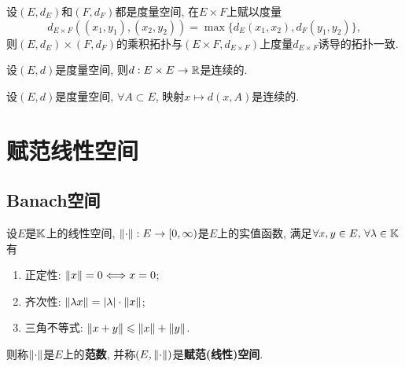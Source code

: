\begin{Remark}
	设$ (E,d_E) $和$ (F,d_F) $都是度量空间, 在$ E\times F $上赋以度量
	\[
		d_{E\times F}\left((x_1,y_1),(x_2,y_2)\right)=\max\{ d_E(x_1,x_2), d_F(y_1,y_2) \},
	\]
	则$ (E,d_E) \times (F,d_F) $的乘积拓扑与$ (E\times F, d_{E\times F}) $上度量$ d_{E\times F} $诱导的拓扑一致.
\end{Remark}

\begin{Proposition}
	设$ (E,d) $是度量空间, 则$ d : E\times E\to\mathbb{R} $是连续的.
\end{Proposition}
\begin{Corollary}\label{cor:距离函数连续}
	设$ (E,d) $是度量空间, $ \forall A\subset E $, 映射$ x\mapsto d(x,A) $是连续的.
\end{Corollary}

\section{赋范线性空间}

\subsection{Banach空间}

\begin{Definition}[赋范空间]\label{def:赋范空间}
	设$ E $是$ \mathbb{K} $上的线性空间, $ \left\| \cdot \right\| : E\to[0,\infty) $是$ E $上的实值函数, 满足$ \forall x,y\in E,\,\forall\lambda\in\mathbb{K} $有

	\begin{enumerate}[(1)]
		\item 正定性: $ \left\| x \right\|=0\Longleftrightarrow x=0 $;

		\item 齐次性: $ \left\| \lambda x \right\|=\left| \lambda \right| \cdot\left\| x \right\| $;

		\item 三角不等式: $ \left\| x+y \right\|\leqslant\left\| x \right\|+\left\| y \right\| $.
	\end{enumerate}
	则称$ \left\| \cdot \right\| $是$ E $上的\textbf{范数}, 并称$ (E,\left\| \cdot \right\|) $是\textbf{赋范(线性)空间}.
\end{Definition}

